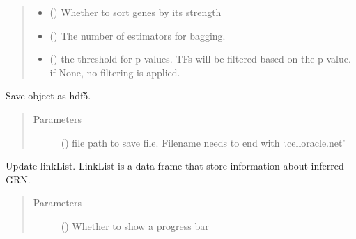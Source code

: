 \documentclass[letterpaper,10pt,english]{sphinxmanual}
\begin{document}
\begin{fulllineitems}
\begin{fulllineitems}
\begin{quote}
\begin{description}
\begin{itemize}
\item {} 
 () \textendash{} Whether to sort genes by its strength

\item {} 
 () \textendash{} The number of estimators for bagging.

\item {} 
 () \textendash{} the threshold for p-values. TFs will be filtered based on the p-value.
if None, no filtering is applied.

\end{itemize}

\end{description}\end{quote}

\end{fulllineitems}


\begin{fulllineitems}
\label{\detokenize{modules/celloracle:celloracle.Net.to_hdf5}}
Save object as hdf5.
\begin{quote}\begin{description}
\item[{Parameters}] \leavevmode
{} () \textendash{} file path to save file. Filename needs to end with ‘.celloracle.net’

\end{description}\end{quote}

\end{fulllineitems}


\begin{fulllineitems}
\label{\detokenize{modules/celloracle:celloracle.Net.updateLinkList}}
Update linkList.
LinkList is a data frame that store information about inferred GRN.
\begin{quote}\begin{description}
\item[{Parameters}] \leavevmode
{} () \textendash{} Whether to show a progress bar


\end{description}
\end{quote}
\end{fulllineitems}
\end{fulllineitems}
\end{document}
